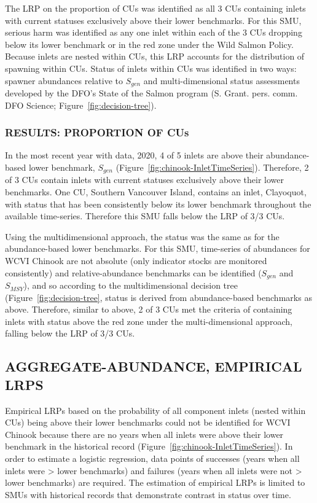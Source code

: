 \documentclass[11pt]{book}
\begin{document}
The LRP on the proportion of CUs was identified as all 3 CUs containing inlets with current statuses exclusively above their lower benchmarks. For this SMU, serious harm was identified as any one inlet within each of the 3 CUs dropping below its lower benchmark or in the red zone under the Wild Salmon Policy. Because inlets are nested within CUs, this LRP accounts for the distribution of spawning within CUs. Status of inlets within CUs was identified in two ways: spawner abundances relative to \(S_{gen}\) and multi-dimensional status assessments developed by the DFO's State of the Salmon program (S. Grant. pers. comm. DFO Science; Figure~\ref{fig:decision-tree}).

\hypertarget{results-proportion-of-cus}{%
\subsubsection{RESULTS: PROPORTION OF CUs}\label{results-proportion-of-cus}}

In the most recent year with data, 2020, 4 of 5 inlets are above their abundance-based lower benchmark, \(S_{gen}\) (Figure~\ref{fig:chinook-InletTimeSeries}). Therefore, 2 of 3 CUs contain inlets with current statuses exclusively above their lower benchmarks. One CU, Southern Vancouver Island, contains an inlet, Clayoquot, with status that has been consistently below its lower benchmark throughout the available time-series. Therefore this SMU falls below the LRP of 3/3 CUs.

Using the multidimensional approach, the status was the same as for the abundance-based lower benchmarks. For this SMU, time-series of abundances for WCVI Chinook are not absolute (only indicator stocks are monitored consistently) and relative-abundance benchmarks can be identified (\(S_{gen}\) and \(S_{MSY}\)), and so according to the multidimensional decision tree (Figure~\ref{fig:decision-tree}, status is derived from abundance-based benchmarks as above. Therefore, similar to above, 2 of 3 CUs met the criteria of containing inlets with status above the red zone under the multi-dimensional approach, falling below the LRP of 3/3 CUs.

\hypertarget{aggregate-abundance-empirical-lrps}{%
\subsection{AGGREGATE-ABUNDANCE, EMPIRICAL LRPS}\label{aggregate-abundance-empirical-lrps}}

Empirical LRPs based on the probability of all component inlets (nested within CUs) being above their lower benchmarks could not be identified for WCVI Chinook because there are no years when all inlets were above their lower benchmark in the historical record (Figure~\ref{fig:chinook-InletTimeSeries}). In order to estimate a logistic regression, data points of successes (years when all inlets were \textgreater{} lower benchmarks) and failures (years when all inlets were not \textgreater{} lower benchmarks) are required. The estimation of empirical LRPs is limited to SMUs with historical records that demonstrate contrast in status over time.
\end{document}
